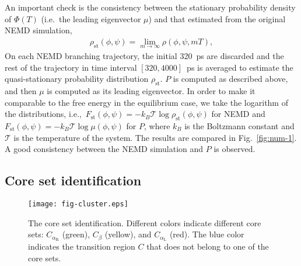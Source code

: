 \documentclass[journal=jctcce,manuscript=article]{achemso}
\newcommand{\mymu}{\mu}
\newcommand{\dih}{\textrm{dih}}
\newcommand{\confaa}[0]{{\alpha_{\textrm{R}}}}
\newcommand{\confc}[0]{{\alpha_{\textrm{L}}}}
\begin{document}
An important check is the consistency between the
stationary probability density of $\Phi(T)$ (i.e.~the leading eigenvector $\mymu$) and that 
estimated from the original NEMD simulation,
\begin{align}
  \label{eq:num-tmp1}
  \rho_{\textrm{st}}(\phi,\psi) = \lim_{m\rightarrow\infty} \rho (\phi,\psi,mT),
\end{align}
On each NEMD branching trajectory, the initial 320~ps are discarded and
the rest of the trajectory in time interval $[320,4000]$~ps is averaged to estimate
the quasi-stationary probability distribution $\rho_{\textrm{st}}$. 
$P$ is computed as described above, and then $\mymu$ is computed as its leading eigenvector. In order to make it comparable to the free energy in the equilibrium case, we take
the logarithm of the distributions, i.e.,~$F_{\textrm{st}}(\phi,\psi)=
-k_B\mathcal T\log \rho_{\textrm{st}}(\phi,\psi)$
for NEMD and $F_{\textrm{st}}(\phi,\psi)=
-k_B\mathcal T\log \mu(\phi,\psi)$ for $P$, where $k_B$ is the
Boltzmann constant and $\mathcal T$ is the temperature of the system.
The
results are  compared in Fig.~\ref{fig:num-1}. A good consistency between
the  NEMD simulation and 
$P$ is observed.  


\subsection{Core set identification}

\begin{figure}
  \centering
  \texttt{[image: fig-cluster.eps]}
  \caption{The core set identification. Different colors indicate different core sets: $C_{\confaa}$ (green), $C_\beta$ (yellow), and $C_{\confc}$ (red).
    The blue color indicates the transition region $C$ that does not belong to one of the core sets.}
  \label{fig:cluster}
\end{figure}
\end{document}
